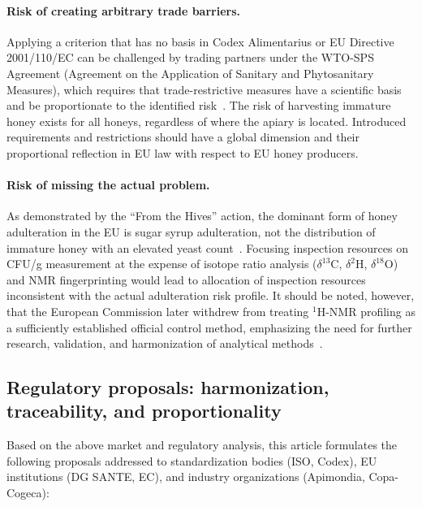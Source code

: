 \paragraph{Risk of creating arbitrary trade barriers.}
Applying a criterion that has no basis in Codex Alimentarius or
EU Directive 2001/110/EC can be challenged by trading partners
under the WTO-SPS Agreement (Agreement on the Application of
Sanitary and Phytosanitary Measures), which requires that
trade-restrictive measures have a scientific basis and be
proportionate to the identified risk~\cite{codex_stan12,eudir2001110}.
The risk of harvesting immature honey exists for all honeys,
regardless of where the apiary is located. Introduced requirements
and restrictions should have a global dimension and their
proportional reflection in EU law with respect to EU honey producers.


\paragraph{Risk of missing the actual problem.}
As demonstrated by the ``From the Hives'' action, the dominant
form of honey adulteration in the EU is sugar syrup adulteration,
not the distribution of immature honey with an elevated yeast
count~\cite{eufromhives2021}.
Focusing inspection resources on CFU/g measurement at the expense
of isotope ratio analysis ($\delta^{13}$C, $\delta^{2}$H,
$\delta^{18}$O) and NMR fingerprinting would lead to allocation
of inspection resources inconsistent with the actual adulteration
risk profile.
It should be noted, however, that the European Commission later
withdrew from treating $^1$H-NMR profiling as a sufficiently
established official control method, emphasizing the need for
further research, validation, and harmonization of analytical
methods~\cite{EuropeanCommission2023NMR}.


\subsection{Regulatory proposals: harmonization, traceability, and proportionality}

Based on the above market and regulatory analysis, this article
formulates the following proposals addressed to standardization
bodies (ISO, Codex), EU institutions (DG SANTE, EC), and industry
organizations (Apimondia, Copa-Cogeca):

